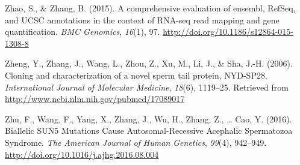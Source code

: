 \documentclass[12pt,twoside]{reedthesis}
\theoremstyle{definition}
\theoremstyle{definition}
\theoremstyle{remark}
\begin{document}
  \hypertarget{ref-Zhao2015}{}
  Zhao, S., \& Zhang, B. (2015). A comprehensive evaluation of ensembl,
  RefSeq, and UCSC annotations in the context of RNA-seq read mapping and
  gene quantification. \emph{BMC Genomics}, \emph{16}(1), 97.
  \url{http://doi.org/10.1186/s12864-015-1308-8}
  
  \hypertarget{ref-Zheng2006}{}
  Zheng, Y., Zhang, J., Wang, L., Zhou, Z., Xu, M., Li, J., \& Sha, J.-H.
  (2006). Cloning and characterization of a novel sperm tail protein,
  NYD-SP28. \emph{International Journal of Molecular Medicine},
  \emph{18}(6), 1119--25. Retrieved from
  \url{http://www.ncbi.nlm.nih.gov/pubmed/17089017}
  
  \hypertarget{ref-Zhu2016}{}
  Zhu, F., Wang, F., Yang, X., Zhang, J., Wu, H., Zhang, Z., \ldots{} Cao,
  Y. (2016). Biallelic SUN5 Mutations Cause Autosomal-Recessive Acephalic
  Spermatozoa Syndrome. \emph{The American Journal of Human Genetics},
  \emph{99}(4), 942--949. \url{http://doi.org/10.1016/j.ajhg.2016.08.004}


\end{document}
